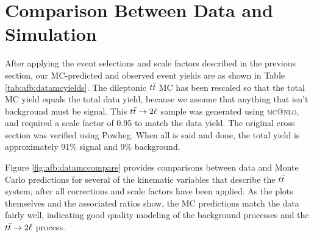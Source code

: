 \section{Comparison Between Data and Simulation}
\label{sec:afb:datamccompare}

After applying the event selections and scale factors described in the
previous section, our MC-predicted and observed event yields are as
shown in Table \ref{tab:afb:datamcyields}. The dileptonic $t\bar{t}$
MC has been rescaled so that the total MC yield equals the total data
yield, because we assume that anything that isn't background must be
signal. This $t\bar{t} \rightarrow 2\ell$ sample was generated using \textsc{mc@nlo}, and
required a scale factor of 0.95 to match the data yield. The original
cross section was verified using Powheg. When all is said and done, the
total yield is approximately 91\% signal and 9\% background.

Figure \ref{fig:afb:datamccompare} provides comparisons between data
and Monte Carlo predictions for several of the kinematic variables
that describe the $t\bar{t}$ system, after all corrections and scale
factors have been applied. As the plots themselves and the associated
ratios show, the MC predictions match the data fairly well, indicating
good quality modeling of the background processes and the
$t\bar{t} \rightarrow 2\ell$ process.

